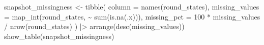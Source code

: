 \documentclass[
  letterpaper,
  DIV=11,
  numbers=noendperiod]{scrartcl}
\newenvironment{Shaded}{\begin{snugshade}}{\end{snugshade}}
\newcommand{\AttributeTok}[1]{\textcolor[rgb]{0.40,0.45,0.13}{#1}}
\newcommand{\DecValTok}[1]{\textcolor[rgb]{0.68,0.00,0.00}{#1}}
\newcommand{\FunctionTok}[1]{\textcolor[rgb]{0.28,0.35,0.67}{#1}}
\newcommand{\NormalTok}[1]{\textcolor[rgb]{0.00,0.23,0.31}{#1}}
\newcommand{\OtherTok}[1]{\textcolor[rgb]{0.00,0.23,0.31}{#1}}
\newcommand{\SpecialCharTok}[1]{\textcolor[rgb]{0.37,0.37,0.37}{#1}}
\begin{document}
\begin{Shaded}
\begin{Highlighting}[]
\NormalTok{snapshot\_missingness }\OtherTok{\textless{}{-}} \FunctionTok{tibble}\NormalTok{(}
  \AttributeTok{column =} \FunctionTok{names}\NormalTok{(round\_states),}
  \AttributeTok{missing\_values =} \FunctionTok{map\_int}\NormalTok{(round\_states, }\SpecialCharTok{\textasciitilde{}} \FunctionTok{sum}\NormalTok{(}\FunctionTok{is.na}\NormalTok{(.x))),}
  \AttributeTok{missing\_pct =} \DecValTok{100} \SpecialCharTok{*}\NormalTok{ missing\_values }\SpecialCharTok{/} \FunctionTok{nrow}\NormalTok{(round\_states)}
\NormalTok{) }\SpecialCharTok{|\textgreater{}}
  \FunctionTok{arrange}\NormalTok{(}\FunctionTok{desc}\NormalTok{(missing\_values))}
\FunctionTok{show\_table}\NormalTok{(snapshot\_missingness)}
\end{Highlighting}
\end{Shaded}
\end{document}
